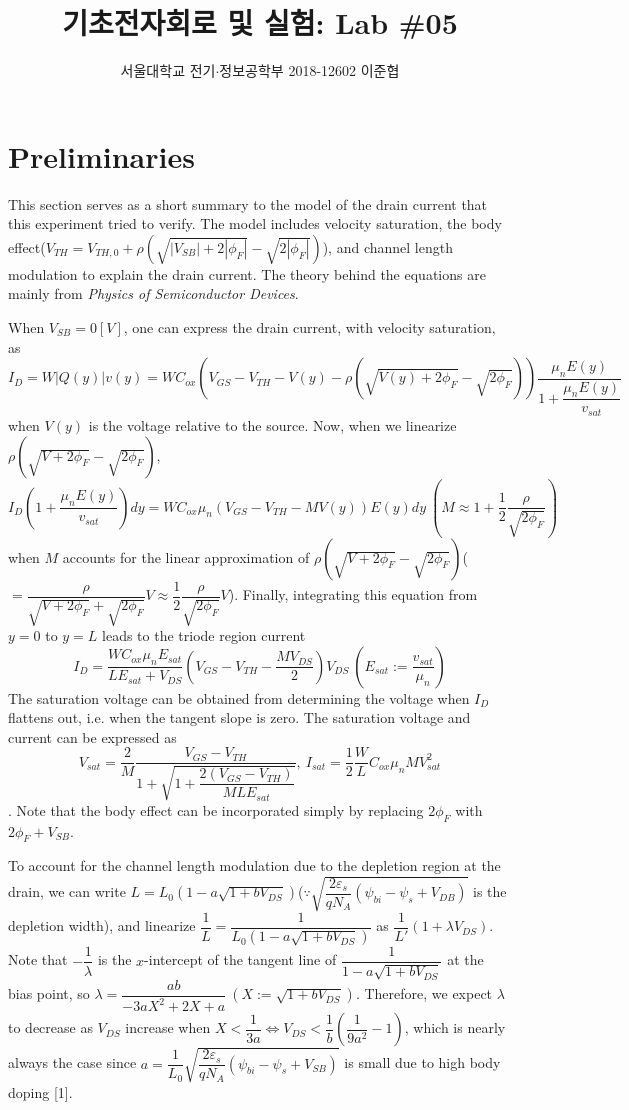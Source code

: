 \documentclass[a4paper, itemph]{oblivoir}
\theoremstyle{definition}
\begin{document}
\title{기초전자회로 및 실험: Lab \#05}
\author{서울대학교 전기$\cdot$정보공학부 2018-12602 이준협}
\maketitle

\section{Preliminaries}
This section serves as a short summary to the model of the drain current that this experiment tried to verify. The model includes velocity saturation, the body effect($V_{TH}=V_{TH,0}+\rho(\sqrt{|V_{SB}|+2|\phi_F|}-\sqrt{2|\phi_F|})$), and channel length modulation to explain the drain current. The theory behind the equations are mainly from \textit{Physics of Semiconductor Devices}.

When $V_{SB}=0[V]$, one can express the drain current, with velocity saturation, as
\[I_D=W|Q(y)|v(y)=WC_{ox}(V_{GS}-V_{TH}-V(y)-\rho(\sqrt{V(y)+2\phi_F}-\sqrt{2\phi_F}))\frac{\mu_n E(y)}{1+\dfrac{\mu_n E(y)}{v_{sat}}}\]
when $V(y)$ is the voltage relative to the source. Now, when we linearize $\rho(\sqrt{V+2\phi_F}-\sqrt{2\phi_F})$,
\[I_D(1+\frac{\mu_n E(y)}{v_{sat}})dy=WC_{ox}\mu_n(V_{GS}-V_{TH}-MV(y))E(y)dy \:(M\approx 1+\frac{1}{2}\frac{\rho}{\sqrt{2\phi_F}})\]
when $M$ accounts for the linear approximation of $\rho(\sqrt{V+2\phi_F}-\sqrt{2\phi_F})$($=\dfrac{\rho}{\sqrt{V+2\phi_F}+\sqrt{2\phi_F}}V $$\approx \dfrac{1}{2}\dfrac{\rho}{\sqrt{2\phi_F}}V$). Finally, integrating this equation from $y=0$ to $y=L$ leads to the triode region current
\begin{equation}I_D=\dfrac{WC_{ox}\mu_nE_{sat}}{LE_{sat}+V_{DS}}(V_{GS}-V_{TH}-\frac{MV_{DS}}{2})V_{DS}\:(E_{sat}:=\frac{v_{sat}}{\mu_n})\end{equation}
The saturation voltage can be obtained from determining the voltage when $I_D$ flattens out, i.e. when the tangent slope is zero. The saturation voltage and current can be expressed as
\begin{equation}V_{sat}=\frac{2}{M}\frac{V_{GS}-V_{TH}}{1+\sqrt{1+\dfrac{2(V_{GS}-V_{TH})}{MLE_{sat}}}},\:I_{sat}=\frac{1}{2}\frac{W}{L}C_{ox}\mu_nMV_{sat}^2\end{equation}. Note that the body effect can be incorporated simply by replacing $2\phi_F$ with $2\phi_F+V_{SB}$.

To account for the channel length modulation due to the depletion region at the drain, we can write $L=L_0(1-a\sqrt{1+bV_{DS}})$($\because\sqrt{\dfrac{2\varepsilon_s}{qN_A}(\psi_{bi}-\psi_s+V_{DB})}$ is the depletion width), and linearize $\dfrac{1}{L}=\dfrac{1}{L_0(1-a\sqrt{1+bV_{DS}})}$ as $\dfrac{1}{L'}(1+\lambda V_{DS})$. Note that $-\dfrac{1}{\lambda}$ is the $x$-intercept of the tangent line of $\dfrac{1}{1-a\sqrt{1+bV_{DS}}}$ at the bias point, so $\lambda=\dfrac{ab}{-3aX^2+2X+a}\:(X:=\sqrt{1+bV_{DS}})$. Therefore, we expect $\lambda$ to decrease as $V_{DS}$ increase when $X<\dfrac{1}{3a}\Leftrightarrow V_{DS}<\dfrac{1}{b}\left(\dfrac{1}{9a^2}-1\right)$, which is nearly always the case since $a=\dfrac{1}{L_0}\sqrt{\dfrac{2\varepsilon_s}{qN_A}(\psi_{bi}-\psi_s+V_{SB})}$ is small due to high body doping [1].
\end{document}
